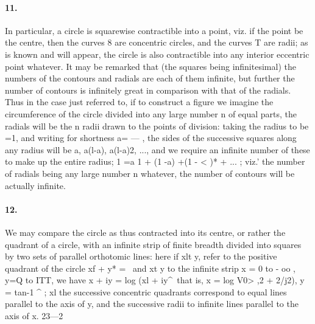\documentclass[11pt,a4paper]{book}
\begin{document}
{{{{{{\paragraph{11.} In    particular,    a    circle    is    squarewise    contractible    into   a   point,   viz.   if    the
point   be   the   centre,    then   the   curves   8  are    concentric   circles,   and   the   curves    T  are
radii;    as   is   known   and    will   appear,   the   circle   is    also    contractible    into    any   interior
eccentric   point   whatever.     It    may   be   remarked   that   (the   squares    being    infinitesimal)
the   numbers   of    the    contours   and   radials   are   each    of    them   infinite,    but   further    the
number   of  contours   is   infinitely   great   in   comparison   with    that   of  the   radials.      Thus
in   the   case  just   referred    to,    if    to    construct   a   figure    we    imagine    the    circumference
of    the    circle    divided    into    any   large    number    n    of    equal    parts,    the    radials    will    be
the   n   radii   drawn  to  the  points  of  division:    taking  the  radius  to  be  =1,  and  writing
for  shortness  a=    ---  ,    the    sides    of    the    successive    squares    along   any    radius    will    be    a,
a(l-a),  a(l-a)2,  ...,  and  we  require  an  infinite  number  of  these  to  make  up  the
entire  radius;  1  =a  {1  +  (1  -a)  +(1  -  < )*  +  ...}  ;  viz.'  the  number  of  radials  being  any
large  number  n  whatever,  the  number  of  contours  will  be  actually  infinite.
\paragraph{12.} We    may   compare    the    circle    as    thus    contracted    into    its   centre,   or   rather
the   quadrant   of  a   circle,   with   an   infinite   strip   of  finite    breadth   divided   into   squares
by   two    sets   of  parallel    orthotomic    lines:    here    if  xlt  y,  refer   to   the  positive   quadrant
of    the    circle    xf  +  y*  =  \,   and    xt   y   to    the    infinite    strip   x  =  0    to    -  oo  ,    y=Q   to    ITT,
we  have  x  +  iy  =  log  (xl  +  iy^\  that  is,
x  =  log  V0> ,2  +  2/j2),     y  =  tan-1  ^  ;
xl
the  successive  concentric  quadrants  correspond  to  equal  lines  parallel  to  the  axis  of
y,  and  the  successive  radii  to  infinite  lines  parallel  to  the  axis  of  x.
23---2


}}}}}}
\end{document}
